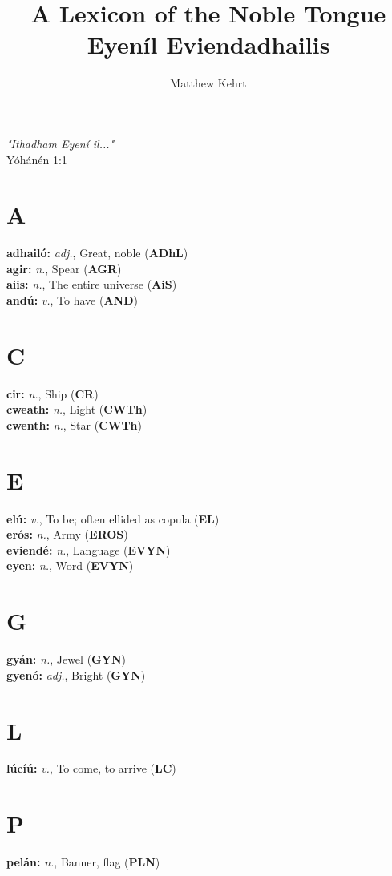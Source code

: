 \documentclass[10pt]{article}
\begin{document}
\newcommand{\todo}[1]{\textcolor{red}{#1}}

\newcommand{\entry}[4]{\noindent\textbf{#1:} \textit{#2}, #3 (\textbf {#4})\\}

\title{A Lexicon of the Noble Tongue \\ Eyen\'il Eviendadhailis}

\author{Matthew Kehrt}

\maketitle

\begin{center}\textit{"Ithadham Eyen\'i il..."} \\ Y\'oh\'an\'en 1:1\end{center}
\vspace{.5cm}

\begin{multicols}{2}

\section*{A}
  \entry{adhailó}{adj.}{Great, noble}{ADhL}
  \entry{agir}{n.}{Spear}{AGR}
  \entry{aiis}{n.}{The entire universe}{AiS}
  \entry{and\'u}{v.}{To have}{AND}
\section*{C}
  \entry{cir}{n.}{Ship}{CR}
  \entry{cweath}{n.}{Light}{CWTh}
  \entry{cwenth}{n.}{Star}{CWTh}
\section*{E}
  \entry{el\'u}{v.}{To be; often ellided as copula}{EL}
  \entry{er\'os}{n.}{Army}{EROS}
  \entry{eviend\'e}{n.}{Language}{EVYN}
  \entry{eyen}{n.}{Word}{EVYN}
\section*{G}
  \entry{gy\'an}{n.}{Jewel}{GYN}
  \entry{gyenó}{adj.}{Bright}{GYN}
\section*{L}
  \entry{l\'uc\'i\'u}{v.}{To come, to arrive}{LC}
\section*{P}
  \entry{pel\'an}{n.}{Banner, flag}{PLN}

\end{multicols}
\end{document}
